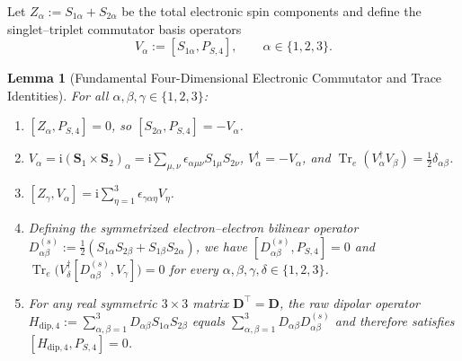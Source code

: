 \documentclass[onecolumn,10pt,notitlepage,amsmath,amssymb,floatfix]{revtex4-2}
\theoremstyle{plain}
\newtheorem{lemma}[theorem]{Lemma}
\theoremstyle{definition}
\newcommand{\ii}{\mathrm{i}}
\newcommand{\Tr}{\operatorname{Tr}}
\begin{document}
Let $Z_\alpha := S_{1\alpha} + S_{2\alpha}$ be the total electronic spin components and define the singlet--triplet commutator basis operators
\begin{equation}
\label{eq:S1_Valpha}
V_\alpha := [S_{1\alpha}, P_{S,4}], \qquad \alpha \in \{1,2,3\}.
\end{equation}

\begin{lemma}[Fundamental Four-Dimensional Electronic Commutator and Trace Identities]
\label{lem:S1_elec_identities}
For all $\alpha, \beta, \gamma \in \{1,2,3\}$:
\begin{enumerate}[label=(\roman*),leftmargin=1.8em,itemsep=2pt]
\item $[Z_\alpha, P_{S,4}] = 0$, so $[S_{2\alpha}, P_{S,4}] = -V_\alpha$.
\item $V_\alpha = \ii(\mathbf{S}_1 \times \mathbf{S}_2)_\alpha = \ii\sum_{\mu,\nu}\epsilon_{\alpha\mu\nu} S_{1\mu} S_{2\nu}$, $V_\alpha^\dagger = -V_\alpha$, and $\Tr_e(V_\alpha^\dagger V_\beta) = \frac{1}{2}\delta_{\alpha\beta}$.
\item $[Z_\gamma, V_\alpha] = \ii\sum_{\eta=1}^3 \epsilon_{\gamma\alpha\eta} V_\eta$.
\item Defining the symmetrized electron--electron bilinear operator $D^{(s)}_{\alpha\beta} := \frac{1}{2}(S_{1\alpha}S_{2\beta} + S_{1\beta}S_{2\alpha})$, we have $[D^{(s)}_{\alpha\beta}, P_{S,4}] = 0$ and $\Tr_e\bigl(V_\delta^\dagger [D^{(s)}_{\alpha\beta}, V_\gamma]\bigr) = 0$ for every $\alpha,\beta,\gamma,\delta \in \{1,2,3\}$.
\item For any real symmetric $3\times 3$ matrix $\mathbf{D}^\top = \mathbf{D}$, the raw dipolar operator $H_{\mathrm{dip},4} := \sum_{\alpha,\beta=1}^3 D_{\alpha\beta} S_{1\alpha} S_{2\beta}$ equals $\sum_{\alpha,\beta=1}^3 D_{\alpha\beta} D^{(s)}_{\alpha\beta}$ and therefore satisfies $[H_{\mathrm{dip},4}, P_{S,4}] = 0$.
\end{enumerate}
\end{lemma}
\end{document}
